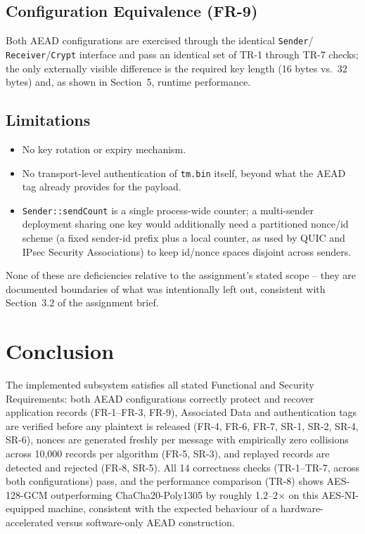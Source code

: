 \documentclass[11pt]{article}
\begin{document}
\subsection*{Configuration Equivalence (FR-9)}
Both AEAD configurations are exercised through the identical \texttt{Sender}/
\texttt{Receiver}/\texttt{Crypt} interface and pass an identical set of TR-1 through
TR-7 checks; the only externally visible difference is the required key length (16
bytes vs.\ 32 bytes) and, as shown in Section~5, runtime performance.

\subsection*{Limitations}
\begin{itemize}[leftmargin=1.2cm]
\item No key rotation or expiry mechanism.
\item No transport-level authentication of \texttt{tm.bin} itself, beyond what the
AEAD tag already provides for the payload.
\item \texttt{Sender::sendCount} is a single process-wide counter; a multi-sender
deployment sharing one key would additionally need a partitioned nonce/id scheme (a
fixed sender-id prefix plus a local counter, as used by QUIC and IPsec Security
Associations) to keep id/nonce spaces disjoint across senders.
\end{itemize}
None of these are deficiencies relative to the assignment's stated scope -- they are
documented boundaries of what was intentionally left out, consistent with
Section~3.2 of the assignment brief.

\section{Conclusion}

The implemented subsystem satisfies all stated Functional and Security Requirements:
both AEAD configurations correctly protect and recover application records
(FR-1--FR-3, FR-9), Associated Data and authentication tags are verified before any
plaintext is released (FR-4, FR-6, FR-7, SR-1, SR-2, SR-4, SR-6), nonces are generated
freshly per message with empirically zero collisions across 10{,}000 records per
algorithm (FR-5, SR-3), and replayed records are detected and rejected (FR-8, SR-5).
All 14 correctness checks (TR-1--TR-7, across both configurations) pass, and the
performance comparison (TR-8) shows AES-128-GCM outperforming ChaCha20-Poly1305 by
roughly 1.2--2$\times$ on this AES-NI-equipped machine, consistent with the expected
behaviour of a hardware-accelerated versus software-only AEAD construction.
\end{document}
